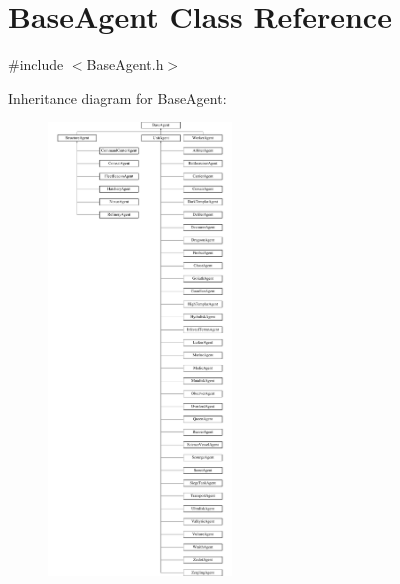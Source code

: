 \hypertarget{class_base_agent}{\section{Base\-Agent Class Reference}
\label{class_base_agent}
}


{\ttfamily \#include $<$Base\-Agent.\-h$>$}

Inheritance diagram for Base\-Agent\-:\begin{figure}[H]
\begin{center}
\leavevmode
\includegraphics[height=12.000000cm]{class_base_agent}
\end{center}
\end{figure}
